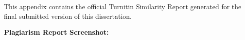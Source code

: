 This appendix contains the official Turnitin Similarity Report 
generated for the final submitted version of this dissertation.

\textbf{Plagiarism Report Screenshot:}

